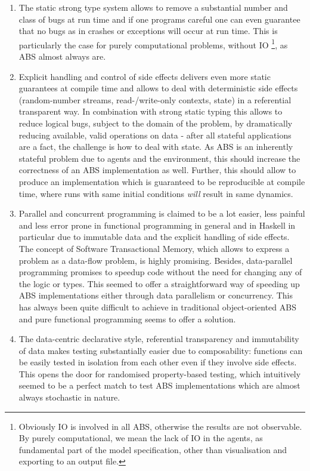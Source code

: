 \begin{enumerate}
	\item The static strong type system allows to remove a substantial number and class of bugs at run time and if one programs careful one can even guarantee that no bugs as in crashes or exceptions will occur at run time. This is particularly the case for purely computational problems, without IO \footnote{Obviously IO is involved in all ABS, otherwise the results are not observable. By purely computational, we mean the lack of IO in the agents, as fundamental part of the model specification, other than visualisation and exporting to an output file.}, as ABS almost always are. 
	
	\item Explicit handling and control of side effects delivers even more static guarantees at compile time and allows to deal with deterministic side effects (random-number streams, read-/write-only contexts, state) in a referential transparent way. In combination with strong static typing this allows to reduce logical bugs, subject to the domain of the problem, by dramatically reducing available, valid operations on data - after all stateful applications are a fact, the challenge is how to deal with state. As ABS is an inherently stateful problem due to agents and the environment, this should increase the correctness of an ABS implementation as well. Further, this should allow to produce an implementation which is guaranteed to be reproducible at compile time, where runs with same initial conditions \textit{will} result in same dynamics.
	
	\item Parallel and concurrent programming is claimed to be a lot easier, less painful and less error prone in functional programming in general and in Haskell in particular due to immutable data and the explicit handling of side effects. The concept of Software Transactional Memory, which allows to express a problem as a data-flow problem, is highly promising. Besides, data-parallel programming promises to speedup code without the need for changing any of the logic or types. This seemed to offer a straightforward way of speeding up ABS implementations either through data parallelism or concurrency. This has always been quite difficult to achieve in traditional object-oriented ABS and pure functional programming seems to offer a solution.
	
	\item The data-centric declarative style, referential transparency and immutability of data makes testing substantially easier due to composability: functions can be easily tested in isolation from each other even if they involve side effects. This opens the door for randomised property-based testing, which intuitively seemed to be a perfect match to test ABS implementations which are almost always stochastic in nature.
\end{enumerate}

